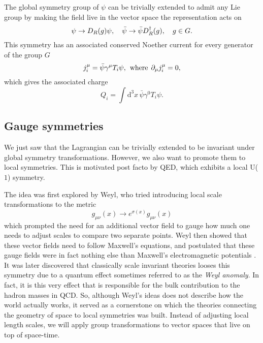The global symmetry group of $\psi$ can be trivially extended to admit any Lie
group by making the field live in the vector space the representation acts on 
%
\begin{equation} \label{eq-global_trafo}
  \psi \to D_R(g) \psi, \hskip1em \bar{\psi} \to \bar{\psi} D_R^{\dagger}(g),
  \hskip1em g \in G.
\end{equation}
%
This symmetry has an associated conserved Noether current for every generator of
the group $G$
%
\begin{equation}
  j^{\mu}_i = \bar{\psi} \gamma^{\mu} T_i \psi, \hskip1ex\text{where}\hskip1ex
    \partial_{\mu}j^{\mu}_i = 0,
\end{equation}
%
which gives the associated charge
%
\begin{equation} \label{eq-noether-charge}
  Q_i = \int \mathrm{d}^3 x\, \bar{\psi} \gamma^0 T_i \psi.
\end{equation}

\subsection{Gauge symmetries}

We just saw that the Lagrangian can be trivially extended to be invariant under
global symmetry transformations. However, we also want to promote them to local
symmetries. This is motivated post facto by QED, which exhibits a local U($1$)
symmetry.

The idea was first explored by Weyl, who tried introducing local scale
transformations to the metric
%
\begin{equation}
  g_{\mu\nu}(x) \to e^{\sigma(x)}g_{\mu\nu}(x)
\end{equation}
%
which prompted the need for an additional vector field to gauge how much one
needs to adjust scales to compare two separate points. Weyl then showed that
these vector fields need to follow Maxwell's equations, and postulated that
these gauge fields were in fact nothing else than Maxwell's electromagnetic
potentials \citep{Weyl:1918ib}. It was later discovered that classically scale
invariant theories looses this symmetry due to a quantum effect sometimes
referred to as the \emph{Weyl anomaly}. In fact, it is this very effect that is
responsible for the bulk contribution to the hadron masses in QCD. So, although
Weyl's ideas does not describe how the world actually works, it served as a
cornerstone on which the theories connecting the geometry of space to local
symmetries was built. Instead of adjusting local length scales, we will apply
group transformations to vector spaces that live on top of space-time.

